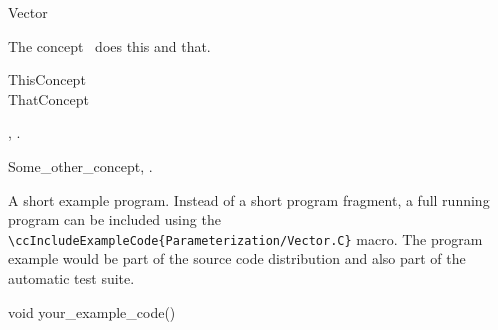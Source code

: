 

\begin{ccRefConcept}[SparseLinearAlgebra_d::]{Vector}


\ccDefinition

The concept \ccRefName\ does this and that.

\ccGeneralizes

ThisConcept \\
ThatConcept

\ccTypes


\ccCreation
{}  %


\ccOperations


\ccHasModels

,
.

\ccSeeAlso

Some\_other\_concept,
.

\ccExample

A short example program.
Instead of a short program fragment, a full running program can be
included using the
\verb|\ccIncludeExampleCode{Parameterization/Vector.C}|
macro. The program example would be part of the source code distribution and
also part of the automatic test suite.

\begin{ccExampleCode}
void your_example_code() {
}
\end{ccExampleCode}


\end{ccRefConcept}


